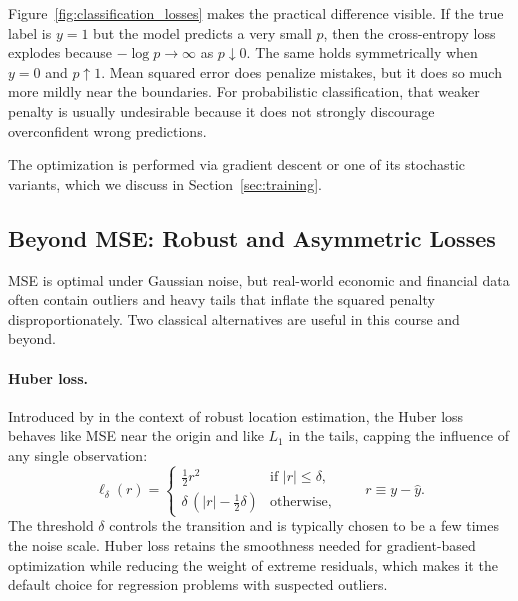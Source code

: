 \documentclass[11pt,a4paper]{report}
\begin{document}
Figure~\ref{fig:classification_losses} makes the practical difference visible.  If the true label is $y=1$ but the model predicts a very small $p$, then the cross-entropy loss explodes because $-\log p \to \infty$ as $p \downarrow 0$.  The same holds symmetrically when $y=0$ and $p \uparrow 1$.  Mean squared error does penalize mistakes, but it does so much more mildly near the boundaries.  For probabilistic classification, that weaker penalty is usually undesirable because it does not strongly discourage overconfident wrong predictions.

The optimization is performed via gradient descent or one of its stochastic variants, which we discuss in Section~\ref{sec:training}.

\subsection{Beyond MSE: Robust and Asymmetric Losses}
\label{sec:robust_losses}

MSE is optimal under Gaussian noise, but real-world economic and financial data often contain outliers and heavy tails that inflate the squared penalty disproportionately.  Two classical alternatives are useful in this course and beyond.

\paragraph{Huber loss.}  Introduced by \citet{huber1964robust} in the context of robust location estimation, the Huber loss behaves like MSE near the origin and like $L_1$ in the tails, capping the influence of any single observation:
\begin{equation}
\ell_\delta(r) = \begin{cases}
\tfrac{1}{2} r^2 & \text{if } |r| \leq \delta, \\
\delta\,(|r| - \tfrac{1}{2}\delta) & \text{otherwise,}
\end{cases}
\qquad r \equiv y - \hat{y}.
\label{eq:huber}
\end{equation}
The threshold $\delta$ controls the transition and is typically chosen to be a few times the noise scale.  Huber loss retains the smoothness needed for gradient-based optimization while reducing the weight of extreme residuals, which makes it the default choice for regression problems with suspected outliers.
\end{document}
